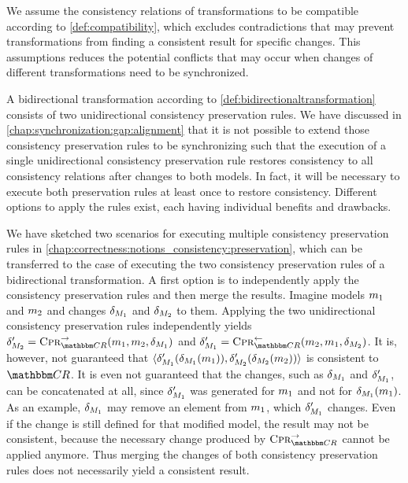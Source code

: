 We assume the consistency relations of transformations to be compatible according to \autoref{def:compatibility}, which excludes contradictions that may prevent transformations from finding a consistent result for specific changes.
This assumptions reduces the potential conflicts that may occur when changes of different transformations need to be synchronized.

A bidirectional transformation according to \autoref{def:bidirectionaltransformation} consists of two unidirectional consistency preservation rules.
We have discussed in \autoref{chap:synchronization:gap:alignment} that it is not possible to extend those consistency preservation rules to be synchronizing such that the execution of a single unidirectional consistency preservation rule restores consistency to all consistency relations after changes to both models.
In fact, it will be necessary to execute both preservation rules at least once to restore consistency.
Different options to apply the rules exist, each having individual benefits and drawbacks.

We have sketched two scenarios for executing multiple consistency preservation rules in \autoref{chap:correctness:notions_consistency:preservation}, which can be transferred to the case of executing the two consistency preservation rules of a bidirectional transformation.
A first option is to independently apply the consistency preservation rules and then merge the results.
Imagine models $\model{m}{1}$ and $\model{m}{2}$ and changes $\change{\metamodel{M}{1}}$ and $\change{\metamodel{M}{2}}$ to them.
Applying the two unidirectional consistency preservation rules independently yields $\change{\metamodel{M}{2}}' = \consistencypreservationrule{\consistencyrelationset{CR}}^{\rightarrow}(\model{m}{1},\model{m}{2}, \change{\metamodel{M}{1}})$ and $\change{\metamodel{M}{1}}' = \consistencypreservationrule{\consistencyrelationset{CR}{}}^{\leftarrow}(\model{m}{2}, \model{m}{1}, \change{\metamodel{M}{2}})$.
It is, however, not guaranteed that $\tupled{\change{\metamodel{M}{1}}'(\change{\metamodel{M}{1}}(\model{m}{1})), \change{\metamodel{M}{2}}'(\change{\metamodel{M}{2}}(\model{m}{2}))}$ is consistent to $\consistencyrelationset{CR}$.
It is even not guaranteed that the changes, such as $\change{\metamodel{M}{1}}$ and $\change{\metamodel{M}{1}}'$, can be concatenated at all, since $\change{\metamodel{M}{1}}'$ was generated for $\model{m}{1}$ and not for $\change{\metamodel{M}{1}}(\model{m}{1})$.
As an example, $\change{\metamodel{M}{1}}$ may remove an element from $\model{m}{1}$, which $\change{\metamodel{M}{1}}'$ changes.
Even if the change is still defined for that modified model, the result may not be consistent, because the necessary change produced by $\consistencypreservationrule{\consistencyrelationset{CR}}^{\rightarrow}$ cannot be applied anymore.
Thus merging the changes of both consistency preservation rules does not necessarily yield a consistent result.

